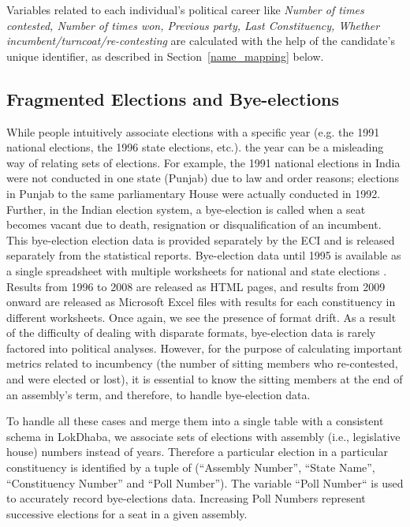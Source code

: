 Variables related to each individual's political career like \emph{Number of times contested, Number of times won, Previous party, Last Constituency, Whether incumbent/turncoat/re-contesting} are calculated with the help of the candidate's unique identifier, as described in Section~\ref{name_mapping} below.

\subsection{Fragmented Elections and Bye-elections}

While people intuitively associate elections with a specific year (e.g. the 1991 national elections, the 1996 state elections, etc.). the year can be a misleading way of relating sets of elections. For example, the 1991 national elections in India were not conducted in one state (Punjab) due to law and order reasons; elections in Punjab to the same parliamentary House were actually conducted in 1992. Further, in the Indian election system, a bye-election is called when a seat becomes vacant due to death, resignation or disqualification of an incumbent. This bye-election election data is provided separately by the ECI and is released separately from the statistical reports\cite{bipolls}. Bye-election data until 1995 is available as a single spreadsheet with multiple worksheets for national and state elections \cite{bipolls52-95}. Results from 1996 to 2008 are released as HTML pages, and results from 2009 onward are released as Microsoft Excel files with results for each constituency in different worksheets. Once again, we see the presence of format drift. As a result of the difficulty of dealing with disparate formats, bye-election data is rarely factored into political analyses. However, for the purpose of calculating important metrics related to incumbency (the number of sitting members who re-contested, and were elected or lost), it is essential to know the sitting members at the end of an assembly's term, and therefore, to handle bye-election data.

To handle all these cases and merge them into a single table with a consistent schema in LokDhaba, we associate sets of elections with assembly (i.e., legislative house) numbers instead of years. Therefore a particular election in a particular constituency is identified by a tuple of (``Assembly Number'', ``State Name'', ``Constituency Number'' and ``Poll Number''). The variable ``Poll Number`` is used to accurately record bye-elections data. Increasing Poll Numbers represent successive elections for a seat in a given assembly.

